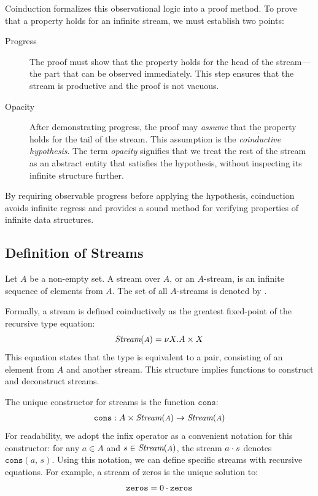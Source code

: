 Coinduction formalizes this observational logic into a proof method. To prove that a property holds
for an infinite stream, we must establish two points:
%
\begin{description}
    \item[Progress] The proof must show that the property holds for the head of the stream---the
          part that can be observed immediately. This step ensures that the stream is productive and
          the proof is not vacuous.
    \item[Opacity] After demonstrating progress, the proof may \emph{assume} that the property holds
          for the tail of the stream. This assumption is the \emph{coinductive hypothesis}. The term
          \emph{opacity} signifies that we treat the rest of the stream as an abstract entity that
          satisfies the hypothesis, without inspecting its infinite structure further.
\end{description}
%
By requiring observable progress before applying the hypothesis, coinduction avoids infinite regress
and provides a sound method for verifying properties of infinite data structures.

\subsection{Definition of Streams}
\label{sec:semantics:streams:def}

Let $A$ be a non-empty set. A stream over $A$, or an $A$-stream, is an infinite sequence of elements
from $A$. The set of all $A$-streams is denoted by .

Formally, a stream is defined coinductively as the greatest fixed-point of the recursive type
equation:
%
\begin{equation}
    \textit{Stream}(\mbox{\footnotesize\ensuremath{A}}) = \nu X. A \times X \label{eq:semantics:streams:type_equation}
\end{equation}
%
This equation states that the type  is equivalent to a pair, consisting of an element from
$A$ and another stream. This structure implies functions to construct and deconstruct streams.

The unique constructor for streams is the function $\texttt{cons}$:
%
\begin{align}
    \texttt{cons}: A \times \textit{Stream}(\mbox{\footnotesize\ensuremath{A}}) \to \textit{Stream}(\mbox{\footnotesize\ensuremath{A}})
\end{align}
%
For readability, we adopt the infix operator \step as a convenient notation for this constructor:
for any $a \in A$ and $s \in \textit{Stream}(\mbox{\footnotesize\ensuremath{A}})$, the stream $a \cdot s$ denotes $\texttt{cons}(a, \, s)$.
Using this notation, we can define specific streams with recursive equations. For example, a stream
of zeros is the unique solution to:
%
\begin{equation}
    \texttt{zeros} = 0 \cdot \texttt{zeros}
\end{equation}


